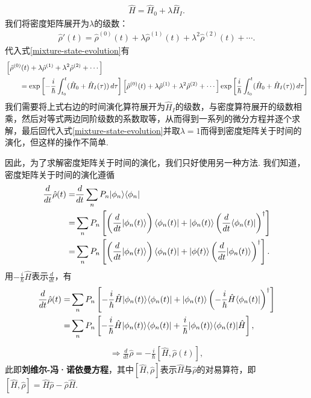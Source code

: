 \documentclass{assignment}
\begin{document}
\begin{itemize}
\begin{itemize}
        \begin{align}
            \hat{H}=\hat{H}_0+\lambda\hat{H}_I.
        \end{align}
        我们将密度矩阵展开为$\lambda$的级数：
        \begin{align}
            \label{density-matrix-expansion}
            \hat{\rho}'(t)=\hat{\rho}^{(0)}(t)+\lambda\hat{\rho}^{(1)}(t)+\lambda^2\hat{\rho}^{(2)}(t)+\cdots.
        \end{align}
        代入式\eqref{mixture-state-evolution}有
        \begin{align}
            \notag&\left[\hat{\rho}^{(0)}(t)+\lambda\hat{\rho}^{(1)}+\lambda^2\hat{\rho}^{(2)}+\cdots\right]\\
            &\qquad=\exp\left[-\frac{i}{\hbar}\int_{t_0}^{t}(\hat{H}_0+\hat{H}_I(\tau))\,d\tau\right]\left[\hat{\rho}^{(0)}(t)+\lambda\hat{\rho}^{(1)}+\lambda^2\hat{\rho}^{(2)}+\cdots\right]\exp\left[\frac{i}{\hbar}\int_{t_0}^t(\hat{H}_0+\hat{H}_I(\tau))\,d\tau\right]
        \end{align}
        我们需要将上式右边的时间演化算符展开为$\hat{H}_I$的级数，与密度算符展开的级数相乘，然后对等式两边同阶级数的系数取等，从而得到一系列的微分方程并逐个求解，最后回代入式\eqref{mixture-state-evolution}并取$\lambda=1$而得到密度矩阵关于时间的演化，但这样的操作不简单.
    \end{itemize}
\end{itemize}

因此，为了求解密度矩阵关于时间的演化，我们只好使用另一种方法. 我们知道，密度矩阵关于时间的演化遵循
\begin{align}
    \notag\frac{d}{dt}\hat{\rho}(t)=&\frac{d}{dt}\sum_nP_n\lvert\phi_n\rangle\langle\phi_n\rvert\\
    \notag=&\sum_nP_n\left[\left(\frac{d}{dt}\lvert\phi_n(t)\rangle\right)\langle\phi_n(t)\rvert+\lvert\phi_n(t)\rangle\left(\frac{d}{dt}\langle\phi_n(t)\rvert\right)^{\dagger}\right]\\
    \notag=&\sum_nP_n\left[\left(\frac{d}{dt}\lvert\phi_n(t)\rangle\right)\langle\phi_n(t)\rvert+\lvert\phi(t)\rangle\left(\frac{d}{dt}\lvert\phi_n(t)\rangle\right)^{\dagger}\right].
\end{align}
用$-\frac{i}{\hbar}\hat{H}$表示$\frac{d}{dt}$，有
\begin{align}
    \notag\frac{d}{dt}\hat{\rho}(t)=&\sum_nP_n\left[-\frac{i}{\hbar}\hat{H}\lvert\phi_n(t)\rangle\langle\phi_n(t)\rvert+\lvert\phi_n(t)\rangle\left(-\frac{i}{\hbar}\hat{H}\langle\phi_n(t)\rvert\right)^{\dagger}\right]\\
    \notag=&\sum_nP_n\left[-\frac{i}{\hbar}\hat{H}\lvert\phi_n(t)\rangle\langle\phi_n(t)\rvert+\frac{i}{\hbar}\lvert\phi_n(t)\rangle\langle\phi_n(t)\rvert\hat{H}\right],
\end{align}
\begin{align}
    \label{Liouville-equ}
    \Longrightarrow\boxed{\frac{d}{dt}\hat{\rho}=-\frac{i}{\hbar}[\hat{H},\hat{\rho}(t)]},
\end{align}
此即\textbf{刘维尔-冯·诺依曼方程}，其中$[\hat{H},\hat{\rho}]$表示$\hat{H}$与$\hat{\rho}$的对易算符，即$[\hat{H},\hat{\rho}]=\hat{H}\hat{\rho}-\hat{\rho}\hat{H}$.
\end{document}
